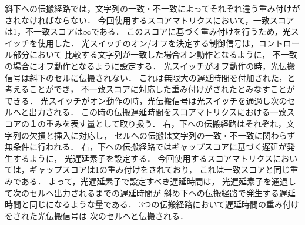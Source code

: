 \begin{itemize}
斜下への伝搬経路では，文字列の一致・不一致によってそれぞれ違う重み付けがされなければならない．
今回使用するスコアマトリクスにおいて，一致スコアは1，不一致スコアは$\infty$である．
このスコアに基づく重み付けを行うため，光スイッチを使用した．
光スイッチのオン/オフを決定する制御信号は，コントロール部分において
比較する文字列が一致した場合オン動作となるように，
不一致の場合にオフ動作となるように設定する．
光スイッチがオフ動作の時，光伝搬信号は斜下のセルに伝搬されない．
これは無限大の遅延時間を付加された，と考えることができ，
不一致スコアに対応した重み付けがされたとみなすことができる．
光スイッチがオン動作の時，光伝搬信号は光スイッチを通過し次のセルへと出力される．
この時の伝搬遅延時間をスコアマトリクスにおける一致スコアの１の重みを表す量として取り扱う．
右，下への伝搬経路はそれぞれ，文字列の欠損と挿入に対応し，
セルへの伝搬は文字列の一致・不一致に関わらず無条件に行われる．
右，下への伝搬経路ではギャップスコアに基づく遅延が発生するように，
光遅延素子を設定する．
今回使用するスコアマトリクスにおいては，ギャップスコアは1の重み付けをされており，
これは一致スコアと同じ重みである．
よって，光遅延素子で設定すべき遅延時間は，
光遅延素子を通過して次のセルへ出力されるまでの遅延時間が
斜め下への伝搬経路で発生する遅延時間と同じになるような量である．
3つの伝搬経路において遅延時間の重み付けをされた光伝搬信号は
次のセルへと伝搬される．
\end{itemize}

